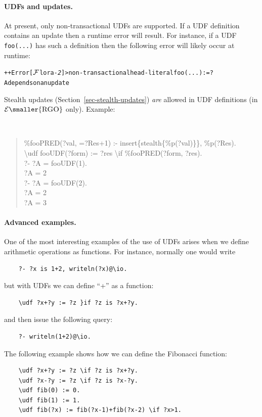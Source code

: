 \documentclass[11pt]{article}
\newcommand{\FLORA}{{\mbox{\sc ${\cal F}${lora}\rm\emph{-2}}}\xspace}
\newcommand{\ERGO}{\ensuremath{\cal{E}\mbox{\smaller{\sc{RGO}}}}\xspace}
\newcommand{\FLSYSTEM}{\FLORA}
\newcommand{\bs}{\textbackslash}
\begin{document}
\paragraph{UDFs and updates.}
At present, only non-transactional UDFs are supported. If a UDF definition
contains an update then a runtime error will result. For instance, if a UDF
\texttt{foo(...)} has such a definition then the following error will
likely occur at runtime: 
\begin{alltt}
++Error[\FLSYSTEM{}]> non-transactional head-literal foo(...) := ?A depends on an update
\end{alltt}
\ifdef{\isfloraman}{}
{
Stealth updates (Section~\ref{sec-stealth-updates})
\emph{are} allowed in UDF definitions (in
$\ERGO$ only).
Example:
{\tt
\begin{quote}
    \%fooPRED(?val, =?Res+1) :- insert\{stealth\{\%p(?val)\}\}, \%p(?Res).
    \\
    \bs{}udf fooUDF(?form) := ?res \bs{}if \%fooPRED(?form, ?res).
    \vspace{2mm}\\
    ?- ?A = fooUDF(1).
    \vspace*{3mm}\\
    ?A = 2
    \vspace{2mm}\\
    ?- ?A = fooUDF(2).
    \vspace*{3mm}\\
    ?A = 2
    \\
    ?A = 3
\end{quote}
  }
}


\paragraph{Advanced examples.}
One of the most interesting examples of the use of UDFs arises when we
define arithmetic operations as functions. For instance, normally one would
write
\begin{verbatim}
    ?- ?x is 1+2, writeln(?x)@\io.
\end{verbatim}
but with UDFs we can define ``+'' as a function:
\begin{verbatim}
    \udf ?x+?y := ?z }if ?z is ?x+?y.
\end{verbatim}
and then issue the following query:
\begin{verbatim}
    ?- writeln(1+2)@\io.
\end{verbatim}
The following example shows how we can define the Fibonacci function:
\begin{verbatim}
    \udf ?x+?y := ?z \if ?z is ?x+?y.
    \udf ?x-?y := ?z \if ?z is ?x-?y.
    \udf fib(0) := 0.
    \udf fib(1) := 1.
    \udf fib(?x) := fib(?x-1)+fib(?x-2) \if ?x>1.
\end{verbatim}
\end{document}
